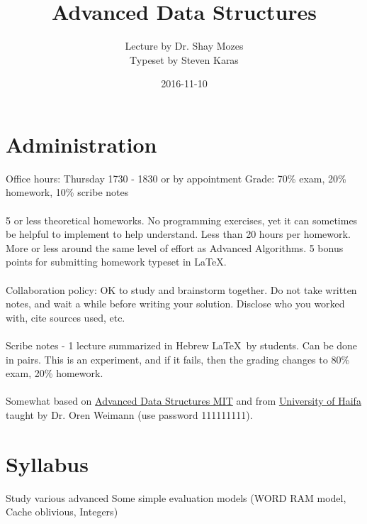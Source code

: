 \documentclass[a4paper]{article}
\title{Advanced Data Structures}
\date{2016-11-10}
\author{Lecture by Dr. Shay Mozes\\Typeset by Steven Karas}
\begin{document}
\maketitle

\section{Administration}

Office hours: Thursday 1730 - 1830 or by appointment
Grade: 70\% exam, 20\% homework, 10\% scribe notes

\paragraph{}
5 or less theoretical homeworks. No programming exercises, yet it can sometimes be helpful to implement to help understand. Less than 20 hours per homework. More or less around the same level of effort as Advanced Algorithms. 5 bonus points for submitting homework typeset in \LaTeX.

\paragraph{}
Collaboration policy: OK to study and brainstorm together. Do not take written notes, and wait a while before writing your solution. Disclose who you worked with, cite sources used, etc.

\paragraph{}
Scribe notes - 1 lecture summarized in Hebrew \LaTeX\ by students. Can be done in pairs. This is an experiment, and if it fails, then the grading changes to 80\% exam, 20\% homework.

\paragraph{}
Somewhat based on \href{http://courses.csail.mit.edu/6.851/}{Advanced Data Structures MIT}
and from \href{http://moodle.haifa.ac.il/course/view.php?id=3538}{University of Haifa} taught by Dr. Oren Weimann (use password 111111111).

\section{Syllabus}

Study various advanced 
Some simple evaluation models (WORD RAM model, Cache oblivious, Integers)
\end{document}
